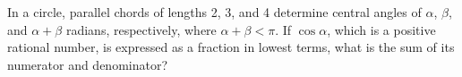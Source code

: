 In a circle, parallel chords of lengths 2, 3, and 4 determine central angles of $\alpha$, $\beta$, and $\alpha + \beta$ radians, respectively, where $\alpha + \beta < \pi$.  If $\cos \alpha$, which is a positive rational number, is expressed as a fraction in lowest terms, what is the sum of its numerator and denominator?
